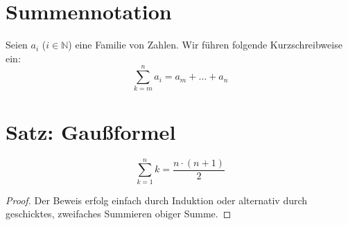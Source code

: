 \documentclass{scrreprt}[twoside=true]
\begin{document}
		\section{Summennotation}
		Seien $a_i$ ($i \in \mathbb{N}$) eine Familie von Zahlen. Wir führen folgende Kurzschreibweise ein:
		\begin{equation*}
			\sum\limits_{k=m}^n a_i = a_m + \dots + a_n
		\end{equation*}

		\section{Satz: Gaußformel}
		\begin{equation*}
				\sum\limits_{k=1}^n k = \frac{n \cdot (n + 1)}{2}
		\end{equation*}
		\begin{proof}
			Der Beweis erfolg einfach durch Induktion oder alternativ durch geschicktes, zweifaches Summieren obiger Summe.  
		\end{proof}

		
\end{document}
